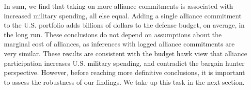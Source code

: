 \documentclass[12pt,hidelinks]{article}
\begin{document}

  
In sum, we find that taking on more alliance commitments is associated with increased military spending, all else equal.
Adding a single alliance commitment to the U.S. portfolio adds billions of dollars to the defense budget, on average, in the long run.
These conclusions do not depend on assumptions about the marginal cost of alliances, as inferences with logged alliance commitments are very similar. 
These results are consistent with the budget hawk view that alliance participation increases U.S. military spending, and contradict the bargain hunter perspective.
However, before reaching more definitive conclusions, it is important to assess the robustness of our findings. 
We take up this task in the next section. 
\end{document}
